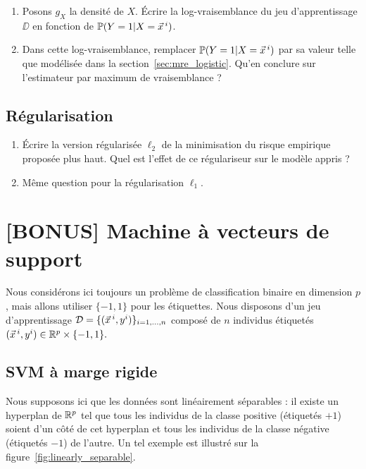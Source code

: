 \documentclass[french,11pt]{article}
\begin{document}
\begin{enumerate}
\item 
  Posons $g_X$ la densité de $X$. Écrire la log-vraisemblance du jeu
  d'apprentissage $\DD$ en fonction de $\PP(Y=1 | X=\xx^i)$.
\item Dans cette log-vraisemblance, remplacer $\PP(Y=1 | X=\xx^i)$ par sa
  valeur telle que modélisée dans la section~\ref{sec:mre_logistic}. Qu'en conclure sur
  l'estimateur par maximum de vraisemblance ?
\end{enumerate}


\subsection{Régularisation}

\begin{enumerate}
\item Écrire la version régularisée $\ell_2$ de la minimisation du risque
  empirique proposée plus haut. %
  Quel est l'effet de ce
  régulariseur sur le modèle appris ?
\item Même question pour la régularisation $\ell_1$.
\end{enumerate}

\pagebreak

\section{[BONUS] Machine à vecteurs de support}
Nous considérons ici toujours un problème de classification binaire en
dimension $p$, mais allons utiliser $\{-1, 1\}$ pour les étiquettes. Nous
disposons d'un jeu d'apprentissage $\DD = \{(\xx^i, y^i)\}_{i=1, \dots, n}$
composé de $n$ individus étiquetés
$(\xx^i, y^i) \in \RR^{p} \times \{-1, 1\}.$


\subsection{SVM à marge rigide}
Nous supposons ici que les données sont linéairement séparables : il existe un
hyperplan de $\mathbb{R}^p$ tel que tous les individus de la classe positive
(étiquetés $+1$) soient d'un côté de cet hyperplan et tous les individus de la
classe négative (étiquetés $-1$) de l'autre. Un tel exemple est illustré sur la figure~\ref{fig:linearly_separable}.
\end{document}
